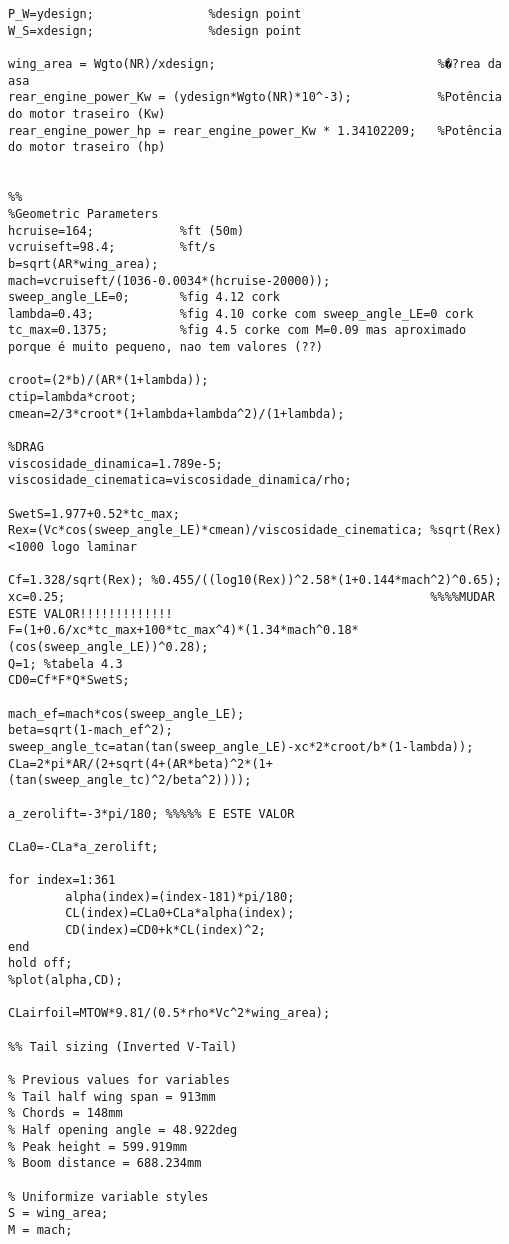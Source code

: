 \begin{verbatim}
P_W=ydesign;                %design point
W_S=xdesign;                %design point

wing_area = Wgto(NR)/xdesign;                               %�?rea da asa
rear_engine_power_Kw = (ydesign*Wgto(NR)*10^-3);            %Potência do motor traseiro (Kw)
rear_engine_power_hp = rear_engine_power_Kw * 1.34102209;   %Potência do motor traseiro (hp)


%%
%Geometric Parameters
hcruise=164;            %ft (50m)
vcruiseft=98.4;         %ft/s
b=sqrt(AR*wing_area);
mach=vcruiseft/(1036-0.0034*(hcruise-20000));
sweep_angle_LE=0;       %fig 4.12 cork
lambda=0.43;            %fig 4.10 corke com sweep_angle_LE=0 cork
tc_max=0.1375;          %fig 4.5 corke com M=0.09 mas aproximado porque é muito pequeno, nao tem valores (??)

croot=(2*b)/(AR*(1+lambda));
ctip=lambda*croot;
cmean=2/3*croot*(1+lambda+lambda^2)/(1+lambda);

%DRAG
viscosidade_dinamica=1.789e-5;
viscosidade_cinematica=viscosidade_dinamica/rho;

SwetS=1.977+0.52*tc_max;
Rex=(Vc*cos(sweep_angle_LE)*cmean)/viscosidade_cinematica; %sqrt(Rex)<1000 logo laminar

Cf=1.328/sqrt(Rex); %0.455/((log10(Rex))^2.58*(1+0.144*mach^2)^0.65);
xc=0.25;                                                   %%%%MUDAR ESTE VALOR!!!!!!!!!!!!!
F=(1+0.6/xc*tc_max+100*tc_max^4)*(1.34*mach^0.18*(cos(sweep_angle_LE))^0.28);
Q=1; %tabela 4.3
CD0=Cf*F*Q*SwetS;

mach_ef=mach*cos(sweep_angle_LE);
beta=sqrt(1-mach_ef^2);
sweep_angle_tc=atan(tan(sweep_angle_LE)-xc*2*croot/b*(1-lambda));
CLa=2*pi*AR/(2+sqrt(4+(AR*beta)^2*(1+(tan(sweep_angle_tc)^2/beta^2))));

a_zerolift=-3*pi/180; %%%%% E ESTE VALOR

CLa0=-CLa*a_zerolift;

for index=1:361
        alpha(index)=(index-181)*pi/180;
        CL(index)=CLa0+CLa*alpha(index);
        CD(index)=CD0+k*CL(index)^2;
end
hold off;
%plot(alpha,CD);

CLairfoil=MTOW*9.81/(0.5*rho*Vc^2*wing_area);

%% Tail sizing (Inverted V-Tail)

% Previous values for variables
% Tail half wing span = 913mm
% Chords = 148mm
% Half opening angle = 48.922deg
% Peak height = 599.919mm
% Boom distance = 688.234mm

% Uniformize variable styles
S = wing_area;
M = mach;


\end{verbatim}
